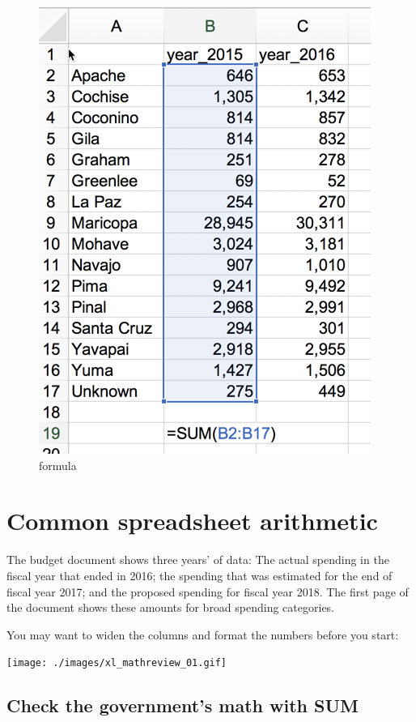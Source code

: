 \documentclass[
  letterpaper,
  DIV=11,
  numbers=noendperiod]{scrreprt}
\begin{document}
\begin{figure}

{\centering \includegraphics{./images/xl_mathreview_00A.png}

}

\caption{formula}

\end{figure}

\hypertarget{common-spreadsheet-arithmetic}{%
\section{Common spreadsheet
arithmetic}\label{common-spreadsheet-arithmetic}}

The budget document shows three years' of data: The actual spending in
the fiscal year that ended in 2016; the spending that was estimated for
the end of fiscal year 2017; and the proposed spending for fiscal year
2018. The first page of the document shows these amounts for broad
spending categories.

You may want to widen the columns and format the numbers before you
start:

\texttt{[image: ./images/xl\_mathreview\_01.gif]}

\hypertarget{check-the-governments-math-with-sum}{%
\subsection{Check the government's math with
SUM}\label{check-the-governments-math-with-sum}}
\end{document}
